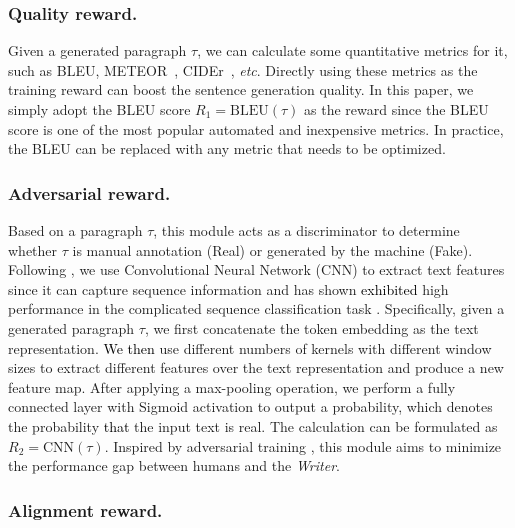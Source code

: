 \documentclass[letterpaper]{article}
\def\hmg{\textcolor{black}}
\begin{document}
\subsubsection{Quality reward.}
Given a generated paragraph $\tau$, we can calculate some quantitative metrics for it, such as BLEU\cite{10.3115/1073083.1073135}, METEOR~\cite{Denkowski2014MeteorUL}, CIDEr~\cite{Vedantam2015CIDErCI}, \textit{etc}. Directly using these metrics as the training reward can boost the sentence generation quality.
In this paper, we simply adopt the BLEU score $R_1=\mathrm{BLEU}(\tau)$ as the reward since the BLEU score is one of the most popular automated and inexpensive metrics. In practice, the BLEU can be replaced with any metric that needs to be optimized.

\subsubsection{Adversarial reward.}
Based on a paragraph $\tau$, this module acts as a discriminator to determine whether $\tau$ is manual annotation (Real) or generated by the machine (Fake).
Following \cite{Yu2017SeqGANSG}, we use Convolutional Neural Network (CNN) to extract text features since it can capture sequence information and has shown \hmg{exhibited} high performance in the complicated sequence classification task \cite{Zhang2015TextUF}. 
Specifically, given a generated paragraph $\tau$, we first concatenate the token embedding as the text representation. 
\hmg{We then }use different numbers of kernels with different window sizes to extract different features over the text representation and produce a new feature map.
After applying a max-pooling operation, we perform a fully connected layer with Sigmoid activation to output a probability, which denotes the probability \hmg{that} the input text is real. The calculation can be formulated as $R_2 = \mathrm{CNN} (\tau)$.
Inspired by adversarial training \cite{cao18a}, this module aims to minimize the performance gap between humans and the \textit{Writer}.

\subsubsection{Alignment reward.}
\end{document}
